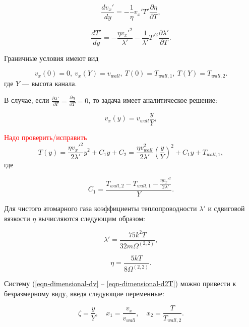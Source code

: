 \documentclass[12pt]{article}
\begin{document}
\begin{equation}
  \frac{d v_{x}'}{d y} = -\frac{1}{\eta} v_{x}' T' \frac{\partial \eta}{\partial T},\label{eqn-dimensional-d2v}
\end{equation}

\begin{equation}
   \frac{dT'}{dy} = -\frac{\eta v_{x}'^2}{\lambda'}
  - \frac{1}{\lambda'} T'^2 \frac{\partial \lambda'}{\partial T}.\label{eqn-dimensional-d2T}
\end{equation}

Граничные условия имеют вид

\begin{equation}
  v_{x}(0) = 0,\:v_{x}(Y) = v_{wall},\:T(0) = T_{wall,1},\:T(Y) = T_{wall,2}.
\end{equation}
где $Y$ --- высота канала.

В случае, если $\frac{\partial \lambda'}{\partial T} = \frac{\partial \eta}{\partial T} = 0$, то задача имеет аналитическое решение:

\begin{equation}
  v_{x}(y) = v_{wall}\frac{y}{Y},
\end{equation}

\textcolor{red}{Надо проверить/исправить}
\begin{equation}
  T(y) = \frac{\eta v_{x}'^2}{2\lambda'}y^2 + C_{1}y + C_{2} = \frac{\eta v_{wall}^2}{2\lambda'}\left(\frac{y}{Y}\right)^2 + C_{1}y + T_{wall,1},
\end{equation}
где

\begin{equation}
  C_{1}= \frac{T_{wall,2} - T_{wall,1} -\frac{\eta v_{x}'^2}{2\lambda'}}{Y}.
\end{equation}

Для чистого атомарного газа коэффициенты теплопроводности $\lambda'$ и сдвиговой вязкости $\eta$ вычисляются следующим образом:

\begin{equation}
  \lambda' = \frac{75k^2T}{32m\Omega^{(2,2)}},
\end{equation}

\begin{equation}
  \eta = \frac{5kT}{8\Omega^{(2,2)}}.
\end{equation}

Систему (\ref{eqn-dimensional-dv} -- \ref{eqn-dimensional-d2T}) можно привести к безразмерному виду, введя следующие переменные:

\begin{equation}
  \zeta = \frac{y}{Y},\quad x_{1} = \frac{v_{x}}{v_{wall}},\quad x_{2} = \frac{T}{T_{wall, 2}}.
\end{equation}
\end{document}
